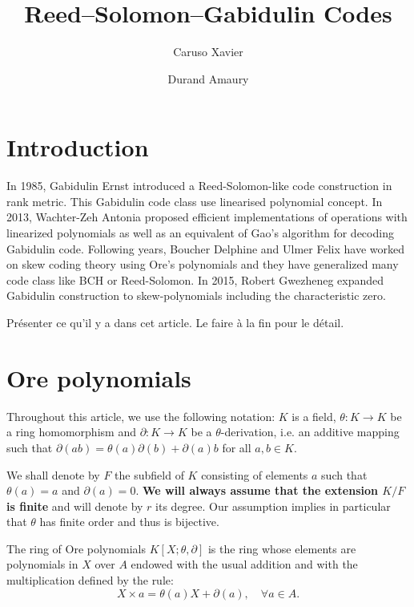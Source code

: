 \documentclass[a4paper]{llncs}
\author{Caruso Xavier \and Durand Amaury}
\institute{CNRS, Institut Mathématique de Bordeaux\\
Rennes ? Versailles ? Besançon ?}
\title{Reed--Solomon--Gabidulin Codes}
\def\todo#1{{\color{todo} #1}}
\begin{document}
\maketitle

\section{Introduction}

In 1985, Gabidulin Ernst introduced a Reed-Solomon-like code 
construction in rank metric. This Gabidulin code class use linearised 
polynomial concept. In 2013, Wachter-Zeh Antonia proposed efficient 
implementations of operations with linearized polynomials as well as an 
equivalent of Gao's algorithm for decoding Gabidulin code. Following 
years, Boucher Delphine and Ulmer Felix have worked on skew coding 
theory using Ore's polynomials and they have generalized many code class 
like BCH or Reed-Solomon. In 2015, Robert Gwezheneg expanded Gabidulin 
construction to skew-polynomials including the characteristic zero.

\todo{Présenter ce qu'il y a dans cet article. Le faire à la fin 
pour le détail.}

\section{Ore polynomials}

Throughout this article, we use the following notation: $K$ is a field, 
$\theta : K \to K$ be a ring homomorphism and $\partial : K \to K$ be a 
$\theta$-derivation, i.e. an additive mapping such that $\partial(ab) = 
\theta(a)\partial(b) + \partial(a)b$ for all $a,b \in K$.

We shall denote by $F$ the subfield of $K$ consisting of elements
$a$ such that $\theta(a) = a$ and $\partial(a) = 0$. 
\textbf{We will always assume that the extension $K/F$ is finite}
and will denote by $r$ its degree. Our assumption implies in particular 
that $\theta$ has finite order and thus is bijective.


\begin{definition}
The ring of Ore polynomials $K[X; \theta, \partial]$ is the ring 
whose elements are polynomials in $X$ over $A$ endowed with the usual 
addition and with the multiplication defined by the rule:
$$X \times a = \theta(a)X + \partial(a), \quad \forall a \in A.$$
%
%
\end{definition}
\end{document}

